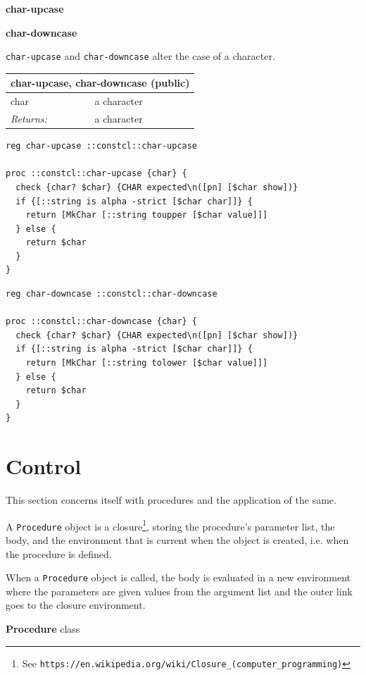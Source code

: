 \documentclass[twoside,9pt]{report}
\begin{document}
\textbf{char-upcase}


\textbf{char-downcase}


\texttt{char-upcase} and \texttt{char-downcase} alter the case of a character.

\begin{tabular}{ |l l| }
\hline
\multicolumn{2}{|l|}{char-upcase, char-downcase (public)} \\
\hline
char & a character \\
\textit{Returns:} & a character \\
\hline
\end{tabular}

\noindent\makebox[\linewidth]{\rule{\linewidth}{0.4pt}}
\begin{lstlisting}
reg char-upcase ::constcl::char-upcase
 
proc ::constcl::char-upcase {char} {
  check {char? $char} {CHAR expected\n([pn] [$char show])}
  if {[::string is alpha -strict [$char char]]} {
    return [MkChar [::string toupper [$char value]]]
  } else {
    return $char
  }
}
\end{lstlisting}
\noindent\makebox[\linewidth]{\rule{\linewidth}{0.4pt}}
\noindent\makebox[\linewidth]{\rule{\linewidth}{0.4pt}}
\begin{lstlisting}
reg char-downcase ::constcl::char-downcase
 
proc ::constcl::char-downcase {char} {
  check {char? $char} {CHAR expected\n([pn] [$char show])}
  if {[::string is alpha -strict [$char char]]} {
    return [MkChar [::string tolower [$char value]]]
  } else {
    return $char
  }
}
\end{lstlisting}
\noindent\makebox[\linewidth]{\rule{\linewidth}{0.4pt}}
\section{Control}
\label{control}

This section concerns itself with procedures and the application of the same.


A \texttt{Procedure} object is a closure\footnote{See \texttt{https://en.wikipedia.org/wiki/Closure\_(computer\_programming)}}, storing the procedure's parameter list, the body, and the environment that is current when the object is created, i.e. when the procedure is defined.


When a \texttt{Procedure} object is called, the body is evaluated in a new environment where the parameters are given values from the argument list and the outer link goes to the closure environment.


\textbf{Procedure} class
\end{document}
